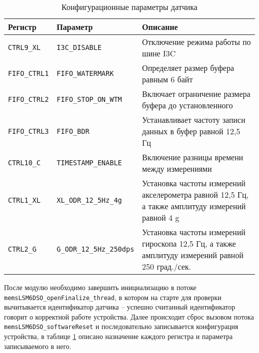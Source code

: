 \begin{table}[ht]
    \caption{Конфигурационные параметры датчика}
    \label{table:func:memsConf}
    \begin{tabular}{| >{\raggedright}m{}
                    | >{\raggedright}m{}
                    | >{\raggedright\arraybackslash}m{}|}
        \hline
        \centering Регистр & \centering Параметр & \centering\arraybackslash Описание \\
  
        \hline
        \lstinline[]$CTRL9_XL$ & 
        \lstinline[]$I3C_DISABLE$ & 
        Отключение режима работы по шине I3C
        \\  
        \hline
        \lstinline[]$FIFO_CTRL1$ & 
        \lstinline[]$FIFO_WATERMARK$& 
        Определяет размер буфера равным 6 байт
        \\  
        \hline
        \lstinline[]$FIFO_CTRL2$ & 
        \lstinline[]$FIFO_STOP_ON_WTM$ & 
        Включает ограничение размера буфера до установленного
        \\  
        \hline
        \lstinline[]$FIFO_CTRL3$ & 
        \lstinline[]$FIFO_BDR$ & 
        Устанавливает частоту записи данных в буфер равной 12,5 Гц
        \\  
        \hline
        \lstinline[]$CTRL10_C$ & 
        \lstinline[]$TIMESTAMP_ENABLE$ & 
        Включение разницы времени между измерениями
        \\
        \hline
        \lstinline[]$CTRL1_XL$ & 
        \lstinline[]$XL_ODR_12_5Hz_4g$ & 
        Установка частоты измерений акселерометра равной 12,5 Гц, а также амплитуду измерений равной 4 g
        \\
        \hline
        \lstinline[]$CTRL2_G$ & 
        \lstinline[]$G_ODR_12_5Hz_250dps$ & 
        Установка частоты измерений гироскопа 12,5 Гц, а также амплитуду измерений равной 250 град./сек.
        \\
        \hline
    \end{tabular}
  \end{table}

После модулю необходимо завершить инициализацию в потоке \lstinline{memsLSM6DSO_openFinalize_thread}, в котором на старте для проверки вычитывается
идентификатор датчика  -- успешно считанный идентификатор говорит о корректной работе устройства. Далее происходит сброс вызовом потока
\lstinline{memsLSM6DSO_softwareReset} и последовательно записывается конфигурация устройства, в таблице \ref{table:func:memsConf} описано назначение
каждого регистра и параметра записываемого в него.

